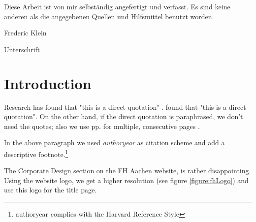 
%



	
\restoregeometry


\clearpage
\vspace*{\fill}
\begin{center}
	\begin{minipage}{.8\textwidth}
		\thispagestyle{empty} %
		Diese Arbeit ist von mir selbst\"andig angefertigt und verfasst. Es sind keine anderen als die angegebenen Quellen und Hilfsmittel benutzt worden.\par
		\vspace{1cm}
		Frederic Klein \dotfill \par
		Unterschrift
	\end{minipage}
\end{center}
\vfill %
\clearpage


\begin{abstract}
	\thispagestyle{plain}
	\setcounter{page}{1}
	\lipsum[1-3]
\end{abstract}

\tableofcontents
\setcounter{page}{2}
\listoffigures

\printnoidxglossary[type=\acronymtype,title={List of Acronyms}]

{\let\clearpage\relax \printnoidxglossary[type=symbols,sort=letter]}

\chapter{Introduction}
Research has found that "this is a direct quotation" \autocite[p. 1]{Doe:1}. \textcite[p. 1]{Doe:1} found that "this is a direct quotation". On the other hand, if the direct quotation is paraphrased, we don't need the quotes; also we use pp. for multiple, consecutive pages \autocite[pp. 35-37]{Doe:2}.\par

In the above paragraph we used \textit{authoryear} as citation scheme and add a descriptive footnote.\footnote{authoryear complies with the Harvard Reference Style}\par

The Corporate Design section on the FH Aachen website, is rather disappointing. Using the website logo, we get a higher resolution (see figure \ref{figure:fhLogo}) and use this logo for the title page.\par

